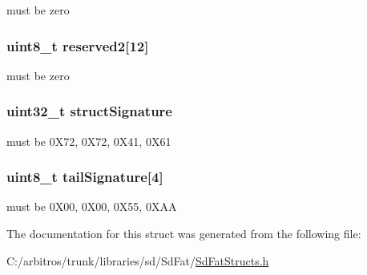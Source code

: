 must be zero \hypertarget{structfat32__fsinfo_af6dc8e21f5c1ca5ca997fc835808802c}{
\subsubsection[{reserved2}]{\setlength{\rightskip}{0pt plus 5cm}uint8\-\_\-t reserved2\mbox{[}12\mbox{]}}}\label{structfat32__fsinfo_af6dc8e21f5c1ca5ca997fc835808802c}
must be zero \hypertarget{structfat32__fsinfo_a31ea8ae6a8d32f61dd576d0d4921f015}{
\subsubsection[{struct\-Signature}]{\setlength{\rightskip}{0pt plus 5cm}uint32\-\_\-t struct\-Signature}}\label{structfat32__fsinfo_a31ea8ae6a8d32f61dd576d0d4921f015}
must be 0\-X72, 0\-X72, 0\-X41, 0\-X61 \hypertarget{structfat32__fsinfo_a89944902cc4effcd8568575786c3a084}{
\subsubsection[{tail\-Signature}]{\setlength{\rightskip}{0pt plus 5cm}uint8\-\_\-t tail\-Signature\mbox{[}4\mbox{]}}}\label{structfat32__fsinfo_a89944902cc4effcd8568575786c3a084}
must be 0\-X00, 0\-X00, 0\-X55, 0\-X\-A\-A 

The documentation for this struct was generated from the following file\-:\begin{DoxyCompactItemize}
\item 
C\-:/arbitros/trunk/libraries/sd/\-Sd\-Fat/\hyperlink{_sd_fat_structs_8h}{Sd\-Fat\-Structs.\-h}\end{DoxyCompactItemize}
